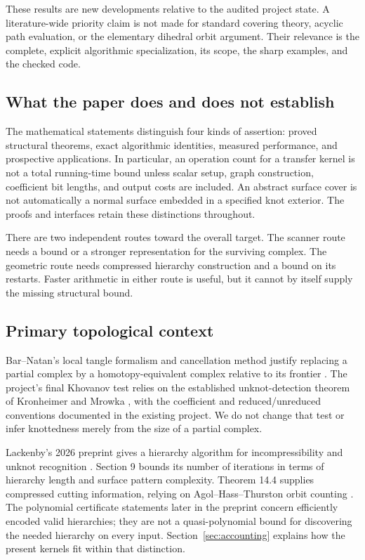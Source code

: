 These results are new developments relative to the audited project
state. A literature-wide priority claim is not made for standard
covering theory, acyclic path evaluation, or the elementary dihedral
orbit argument. Their relevance is the complete, explicit algorithmic
specialization, its scope, the sharp examples, and the checked code.

\subsection{What the paper does and does not establish}

The mathematical statements distinguish four kinds of assertion:
proved structural theorems, exact algorithmic identities, measured
performance, and prospective applications. In particular, an operation
count for a transfer kernel is not a total running-time bound unless
scalar setup, graph construction, coefficient bit lengths, and output
costs are included. An abstract surface cover is not automatically a
normal surface embedded in a specified knot exterior. The proofs and
interfaces retain these distinctions throughout.

There are two independent routes toward the overall target. The
scanner route needs a bound or a stronger representation for the
surviving complex. The geometric route needs compressed hierarchy
construction and a bound on its restarts. Faster arithmetic in either
route is useful, but it cannot by itself supply the missing structural
bound.

\subsection{Primary topological context}

Bar--Natan's local tangle formalism and cancellation method justify
replacing a partial complex by a homotopy-equivalent complex relative
to its frontier \cite{BarNatan2005,BarNatan2007}. The project's final
Khovanov test relies on the established unknot-detection theorem of
Kronheimer and Mrowka \cite{KronheimerMrowka2011}, with the coefficient
and reduced/unreduced conventions documented in the existing project.
We do not change that test or infer knottedness merely from the size of
a partial complex.

Lackenby's 2026 preprint gives a hierarchy algorithm for
incompressibility and unknot recognition \cite{Lackenby2026}. Section 9
bounds its number of iterations in terms of hierarchy length and
surface pattern complexity. Theorem 14.4 supplies compressed cutting
information, relying on Agol--Hass--Thurston orbit counting
\cite{AHT2006}. The polynomial certificate statements later in the
preprint concern efficiently encoded valid hierarchies; they are not a
quasi-polynomial bound for discovering the needed hierarchy on every
input. Section~\ref{sec:accounting} explains how the present kernels fit
within that distinction.
